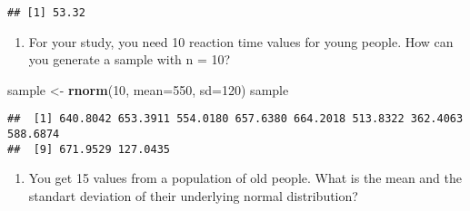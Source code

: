 \documentclass[
]{article}
\newenvironment{Shaded}{\begin{snugshade}}{\end{snugshade}}
\newcommand{\AttributeTok}[1]{\textcolor[rgb]{0.13,0.29,0.53}{#1}}
\newcommand{\DecValTok}[1]{\textcolor[rgb]{0.00,0.00,0.81}{#1}}
\newcommand{\FloatTok}[1]{\textcolor[rgb]{0.00,0.00,0.81}{#1}}
\newcommand{\FunctionTok}[1]{\textcolor[rgb]{0.13,0.29,0.53}{\textbf{#1}}}
\newcommand{\NormalTok}[1]{#1}
\newcommand{\OtherTok}[1]{\textcolor[rgb]{0.56,0.35,0.01}{#1}}
\newcommand{\SpecialCharTok}[1]{\textcolor[rgb]{0.81,0.36,0.00}{\textbf{#1}}}
\newcommand{\StringTok}[1]{\textcolor[rgb]{0.31,0.60,0.02}{#1}}
\providecommand{\tightlist}{%
  \setlength{\itemsep}{0pt}\setlength{\parskip}{0pt}}
\begin{document}
\begin{verbatim}
## [1] 53.32
\end{verbatim}

\begin{enumerate}
\def\labelenumi{\alph{enumi})}
\setcounter{enumi}{2}
\tightlist
\item
  For your study, you need 10 reaction time values for young people. How
  can you generate a sample with n = 10?
\end{enumerate}

\begin{Shaded}
\begin{Highlighting}[]
\NormalTok{sample }\OtherTok{\textless{}{-}} \FunctionTok{rnorm}\NormalTok{(}\DecValTok{10}\NormalTok{, }\AttributeTok{mean=}\DecValTok{550}\NormalTok{, }\AttributeTok{sd=}\DecValTok{120}\NormalTok{)}
\NormalTok{sample}
\end{Highlighting}
\end{Shaded}

\begin{verbatim}
##  [1] 640.8042 653.3911 554.0180 657.6380 664.2018 513.8322 362.4063 588.6874
##  [9] 671.9529 127.0435
\end{verbatim}

\begin{enumerate}
\def\labelenumi{\alph{enumi})}
\setcounter{enumi}{3}
\tightlist
\item
  You get 15 values from a population of old people. What is the mean
  and the standart deviation of their underlying normal distribution?
\end{enumerate}

\begin{Shaded}
\end{Shaded}
\end{document}
